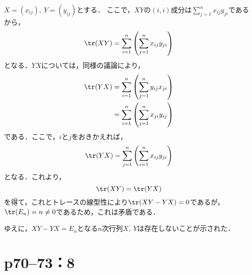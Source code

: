 \begin{tproof}
  $X=(x_{ij}),~Y=(y_{ij})$とする．
  ここで，$XY$の$(i,i)$成分は$\sum_{j=1}^{n} x_{ij} y_{ji}$であるから，
  \begin{equation*}
    \tr (XY)  =  \sum_{i=1}^{n} \left( \sum_{j=1}^{n} x_{ij} y_{ji} \right)
  \end{equation*}
  となる．$YX$については，同様の議論により，
  \begin{align*}
    \tr  (YX) & =  \sum_{i=1}^{n}\left( \sum_{j=1}^{n}  y_{ij} x_{ji} \right)  \\
              & =  \sum_{i=1}^{n} \left( \sum_{j=1}^{n}  x_{ji} y_{ij} \right)
  \end{align*}
  である．ここで，$i$と$j$をおきかえれば，
  \begin{equation}
    \tr  (YX) = \sum_{j=1}^{n} \left( \sum_{i=1}^{n}  x_{ij} y_{ji} \right)
  \end{equation}
  となる．これより，
  \begin{equation}
    \tr (XY) = \tr  (YX)
  \end{equation}
  を得て，これとトレースの線型性により$\tr (XY-YX) =0$であるが，$\tr  (E_n) =n \neq 0$であるため，これは矛盾である．

  ゆえに，$XY-YX=E_n$となる$n$次行列$X,~Y$は存在しないことが示された．
\end{tproof}



\section*{p70--73：8}

